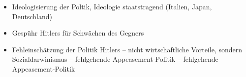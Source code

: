 \begin{itemize}
\item Ideologisierung der Poltik, Ideologie staatstragend (Italien,
Japan, Deutschland)

\item Gespühr Hitlers für Schwächen des Gegners

\item Fehleinschätzung der Politik Hitlers -- nicht wirtschaftliche
Vorteile, sondern Sozialdarwinismus -- fehlgehende Appeasement-Politik
-- fehlgehende Appeasement-Politik
\end{itemize}
